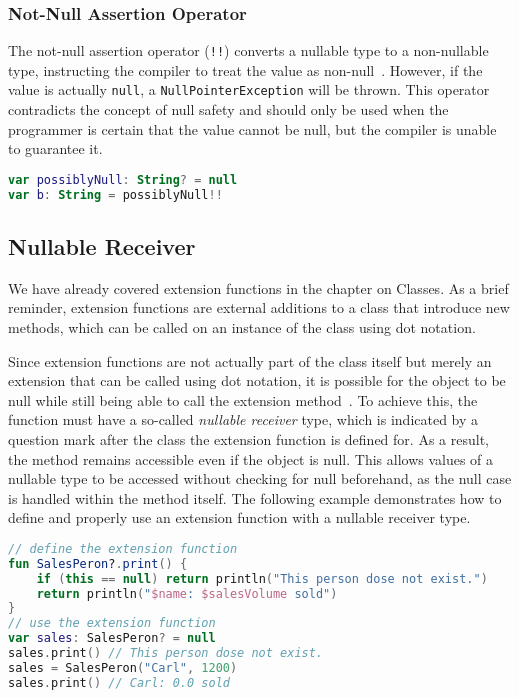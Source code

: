 \documentclass[a4paper,11pt]{article}
\begin{document}
\subsubsection{Not-Null Assertion Operator}
The not-null assertion operator (\texttt{!!}) converts a nullable type to a non-nullable type, instructing the compiler to treat the value as non-null~\cite{nullsafety-assertion}. However, if the value is actually \texttt{null}, a \texttt{NullPointerException} will be thrown.
This operator contradicts the concept of null safety and should only be used when the programmer is certain that the value cannot be null, but the compiler is unable to guarantee it.


\begin{lstlisting}[language=Kotlin, title={Usage of the not-null assertion}]
var possiblyNull: String? = null
var b: String = possiblyNull!!
\end{lstlisting}

\subsection{Nullable Receiver}
We have already covered extension functions in the chapter on Classes. As a brief reminder, extension functions are external additions to a class that introduce new methods, which can be called on an instance of the class using dot notation.

Since extension functions are not actually part of the class itself but merely an extension that can be called using dot notation, it is possible for the object to be null while still being able to call the extension method~\cite{nullsafety-nullable-receiver}. To achieve this, the function must have a so-called \textit{nullable receiver} type, which is indicated by a question mark after the class the extension function is defined for. As a result, the method remains accessible even if the object is null. This allows values of a nullable type to be accessed without checking for null beforehand, as the null case is handled within the method itself. The following example demonstrates how to define and properly use an extension function with a nullable receiver type.
\begin{lstlisting}[language=Kotlin,title={Usage of an extension function}]
// define the extension function
fun SalesPeron?.print() {
    if (this == null) return println("This person dose not exist.")
    return println("$name: $salesVolume sold")
}
// use the extension function
var sales: SalesPeron? = null
sales.print() // This person dose not exist.
sales = SalesPeron("Carl", 1200)
sales.print() // Carl: 0.0 sold
\end{lstlisting}
\end{document}
